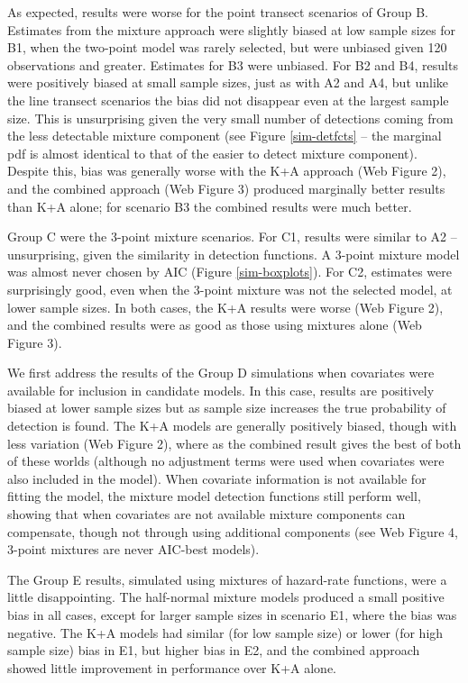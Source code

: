 \documentclass[useAMS,referee,usenatbib]{biom}
\begin{document}
As expected, results were worse for the point transect scenarios of Group B.  Estimates from the mixture approach were slightly biased at low sample sizes for B1, when the two-point model was rarely selected, but were unbiased given 120 observations and greater.  Estimates for B3 were unbiased.  For B2 and B4, results were positively biased at small sample sizes, just as with A2 and A4, but unlike the line transect scenarios the bias did not disappear even at the largest sample size.  This is unsurprising given the very small number of detections coming from the less detectable mixture component (see Figure \ref{sim-detfcts} -- the marginal pdf is almost identical to that of the easier to detect mixture component). Despite this, bias was generally worse with the K+A approach (Web Figure 2), and the combined approach (Web Figure 3) produced marginally better results than K+A alone; for scenario B3 the combined results were much better. 

Group C were the 3-point mixture scenarios.  For C1, results were similar to A2 -- unsurprising, given the similarity in detection functions.  A 3-point mixture model was almost never chosen by AIC (Figure \ref{sim-boxplots}).  For C2, estimates were surprisingly good, even when the 3-point mixture was not the selected model, at lower sample sizes.  In both cases, the K+A results were worse (Web Figure 2), and the combined results were as good as those using mixtures alone (Web Figure 3).

We first address the results of the Group D simulations when covariates were available for inclusion in candidate models. In this case, results are positively biased at lower sample sizes but as sample size increases the true probability of detection is found. The K+A models are generally positively biased, though with less variation (Web Figure 2), where as the combined result gives the best of both of these worlds (although no adjustment terms were used when covariates were also included in the model). When covariate information is not available for fitting the model, the mixture model detection functions still perform well, showing that when covariates are not available mixture components can compensate, though not through using additional components (see Web Figure 4, 3-point mixtures are never AIC-best models).

The Group E results, simulated using mixtures of hazard-rate functions, were a little disappointing.  The half-normal mixture models produced a small positive bias in all cases, except for larger sample sizes in scenario E1, where the bias was negative.  The K+A models had similar (for low sample size) or lower (for high sample size) bias in E1, but higher bias in E2, and the combined approach showed little improvement in performance over K+A alone.
\end{document}
